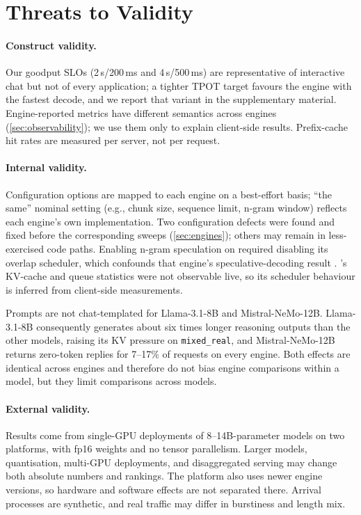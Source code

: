 \section{Threats to Validity}
\label{sec:threats}

\paragraph{Construct validity.}
Our goodput SLOs (2\,s/200\,ms and 4\,s/500\,ms) are representative of interactive chat but not
of every application; a tighter TPOT target favours the engine with the fastest decode, and we
report that variant in the supplementary material. Engine-reported metrics have different
semantics across engines (\cref{sec:observability}); we use them only to explain client-side results.
Prefix-cache hit rates are measured per server, not per request.

\paragraph{Internal validity.}
Configuration options are mapped to each engine on a best-effort basis; ``the same'' nominal
setting (e.g., chunk size, sequence limit, n-gram window) reflects each engine's own
implementation. Two configuration defects were found and fixed before the corresponding sweeps
(\cref{sec:engines}); others may remain in less-exercised code paths. Enabling n-gram speculation
on \trt required disabling its overlap scheduler, which confounds that engine's speculative-decoding
result . \trt's KV-cache and queue
statistics were not observable live, so its scheduler behaviour is inferred from client-side
measurements. 

Prompts are not chat-templated for Llama-3.1-8B and Mistral-NeMo-12B. Llama-3.1-8B consequently
generates about six times longer reasoning outputs than the other models, raising its KV pressure
on \texttt{mixed\_real}, and Mistral-NeMo-12B returns zero-token replies for 7--17\% of requests on
every engine. Both effects are identical across engines and therefore do not bias engine
comparisons within a model, but they limit comparisons across models.

\paragraph{External validity.}
Results come from single-GPU deployments of 8--14B-parameter models on two platforms, with fp16
weights and no tensor parallelism. Larger models, quantisation, multi-GPU deployments, and
disaggregated serving may change both absolute numbers and rankings. The  platform also
uses newer engine versions, so hardware and software effects are not separated there. Arrival
processes are synthetic, and real traffic may differ in burstiness and length mix.

